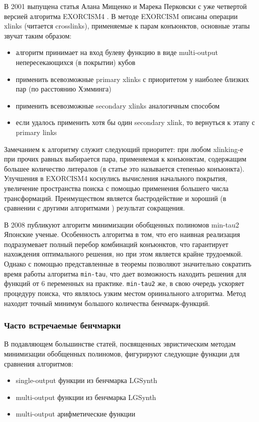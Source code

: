 \documentclass[a4paper,12pt,titlepage,finall]{article}
\begin{document}
В 2001 выпущена статья Алана Мищенко и Марека Перковски с уже четвертой версией алгоритма \textsc{EXORCISM4} \cite{exorcism4}.
В методе \textsc{EXORCISM} описаны операции xlinks (читается crosslinks), применяемые к парам конъюнктов, основные этапы звучат таким образом:
\begin{itemize}
    \item алгоритм принимает на вход булеву функцию в виде multi-output непересекающихся (в покрытии) кубов
    \item применить всевозможные primary xlinks с приоритетом у наиболее близких пар (по расстоянию Хэмминга)
    \item применить всевозможные secondary xlinks аналогичным способом
    \item если удалось применить хотя бы один secondary xlink, то вернуться к этапу с primary links
\end{itemize}
Замечанием к алгоритму служит следующий приоритет: при любом xlinking-е при прочих равных выбирается пара, применяемая к конъюнктам, содержащим большее количество литералов (в статье это называется степенью конъюнкта). Улучшения в \textsc{EXORCISM4} коснулись вычисления начального покрытия, увеличение пространства поиска с помощью применения большего числа трансформаций. Преимуществом является быстродействие и хороший (в сравнении с другими алгоритмами \cite{exmin2} \cite{mint}) результат сокращения.

В 2008 публикуют алгоритм минимизации обобщенных полиномов min-tau2 \cite{min-tau2} Японские ученые.
Особенность алгоритма в том, что его наивная реализация подразумевает полный перебор комбинаций конъюнктов, что гарантирует нахождения оптимального решения, но при этом является крайне трудоемкой. Однако с помощью представленные в \cite{min-tau} теоремы позволяют значительно сократить время работы алгоритма \texttt{min-tau}, что дает возможность находить решения для функций от 6 переменных на практике. \texttt{min-tau2} же, в свою очередь ускоряет процедуру поиска, что являлось узким местом ориинального алгоритма. Метод находит точный минимум большого количества бенчмарк-функций.

\subsubsection*{Часто встречаемые бенчмарки}

В подавляющем большинстве статей, посвященных эвристическим методам минимизации обобщенных полиномов, фигурируют следующие функции для сравнения алгоритмов:
\begin{itemize}
    \item single-output функции из бенчмарка LGSynth
    \item multi-output функции из бенчмарка LGSynth
    \item multi-output арифметические функции
\end{itemize}
\end{document}
